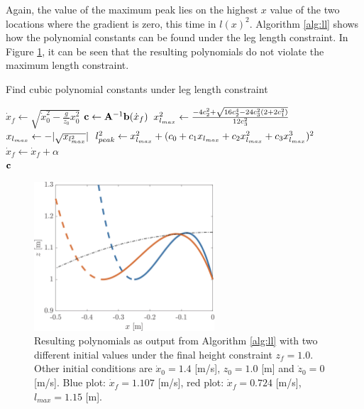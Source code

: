 Again, the value of the maximum peak lies on the highest $x$ value of the two locations where the gradient is zero, this time in $l(x)^2$. Algorithm \ref{alg:ll} shows how the polynomial constants can be found under the leg length constraint. In Figure \ref{fig:pollength}, it can be seen that the resulting polynomials do not violate the maximum length constraint.
\begin{algorithm}
\caption{Find cubic polynomial constants under leg length constraint}
\label{alg:ll}
\begin{algorithmic}[1]
    \State $\dot{x}_{f}\gets \sqrt{\dot{x}_0^2-\frac{g}{z_0}x_0^2}$
        \Repeat
            \State $\mathbf{c}\gets \mathbf{A}^{-1}\mathbf{b}(\dot{x}_{f})$ 
            \State $x_{l_{max}}^2 \gets \frac{-4c_2^2+\sqrt{16c_2^4-24c_3^2(2+2c_1^2)}}{12c_3^2}$   
            \State $x_{l_{max}}\gets-|\sqrt{x_{l_{max}^2}}|$                
            \State $l_{peak}^2 \gets x_{l_{max}}^2 + (c_0 + c_1x_{l_{max}} + c_2x_{l_{max}}^2+ c_3x_{l_{max}}^3)^2$ 
            \State $\dot{x}_{f} \gets \dot{x}_{f}+\alpha$   
        \\
    \Return $\mathbf{c}$    
\end{algorithmic}
\end{algorithm}
\begin{figure}
\centering
\includegraphics[width=0.6\textwidth]{STYLESTUFF/polynomialLengthViz.png}
\caption{Resulting polynomials as output from Algorithm \ref{alg:ll} with two different initial values under the final height constraint $z_f=1.0$. Other initial conditions are $\dot{x}_0=1.4$ [m/s], $z_0=1.0$ [m] and $\dot{z}_0=0$ [m/s]. Blue plot: $\dot{x}_f=1.107$ [m/s], red plot: $\dot{x}_f=0.724$ [m/s], $l_{max}=1.15$ [m]. }
\label{fig:pollength}
\end{figure}
